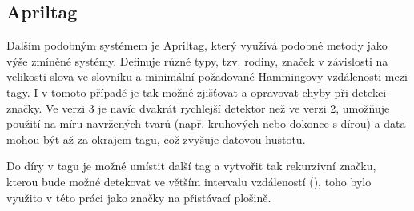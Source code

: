     \subsection{Apriltag}
      Dalším podobným systémem je Apriltag, který využívá podobné metody jako výše zmíněné systémy. Definuje různé typy, tzv. rodiny, značek v závislosti na velikosti slova ve slovníku a minimální požadované Hammingovy vzdálenosti mezi tagy. I v tomoto případě je tak možné zjišťovat a opravovat chyby při detekci značky. \cite{apriltag2} Ve verzi 3 je navíc dvakrát rychlejší detektor než ve verzi 2, umožňuje použití na míru navržených tvarů (např. kruhových nebo dokonce s dírou) a data mohou být až za okrajem tagu, což zvyšuje datovou hustotu. \cite{apriltag3}

      Do díry v tagu je možné umístit další tag a vytvořit tak rekurzivní značku, kterou bude možné detekovat ve větším intervalu vzdáleností (\cite{apriltag3}), toho bylo využito v této práci jako značky na přistávací plošině.